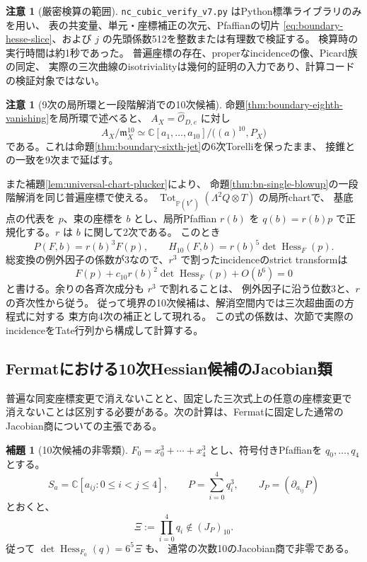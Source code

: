 \documentclass[a4paper,11pt]{ltjsarticle}
\theoremstyle{definition}
\newtheorem{lemma}[theorem]{補題}
\newtheorem{remark}[theorem]{注意}
\newcommand{\CC}{\mathbb C}
\newcommand{\OO}{\mathcal O}
\newcommand{\PP}{\mathbb P}
\begin{document}
\begin{remark}[厳密検算の範囲]
\texttt{nc\_cubic\_verify\_v7.py} はPython標準ライブラリのみを用い、
表の共変量、単元・座標補正の次元、Pfaffianの切片
\eqref{eq:boundary-hesse-slice}、および $j$ の先頭係数512を整数または有理数で検証する。
検算時の実行時間は約1秒であった。
普遍座標の存在、properなincidenceの像、Picard族の同定、
実際の三次曲線のisotrivialityは幾何的証明の入力であり、計算コードの検証対象ではない。
\end{remark}


\begin{remark}[9次の局所環と一段階解消での10次候補]
命題\ref{thm:boundary-eighth-vanishing}を局所環で述べると、
$A_X=\widehat{\OO}_{D,e}$ に対し
\[
 A_X/\mathfrak m_X^{10}
 \simeq\CC[a_1,\ldots,a_{10}]/\bigl((a)^{10},P_X\bigr)
\]
である。これは命題\ref{thm:boundary-sixth-jet}の6次Torelliを保ったまま、
接錐との一致を9次まで延ばす。

また補題\ref{lem:universal-chart-plucker}により、
命題\ref{thm:bn-single-blowup}の一段階解消を同じ普遍座標で使える。
$\operatorname{Tot}_{\PP(V^*)}(\Lambda^2Q\otimes T)$ の局所chartで、
基底点の代表を $p$、束の座標を $b$ とし、局所Pfaffian $r(b)$ を
$q(b)=r(b)p$ で正規化する。$r$ は $b$ に関して2次である。
このとき
\[
 P(F,b)=r(b)^3F(p),\qquad
 H_{10}(F,b)=r(b)^5\det\operatorname{Hess}_F(p).
\]
総変換の例外因子の係数が3なので、$r^3$ で割ったincidenceのstrict transformは
\[
 F(p)+c_{10}r(b)^2\det\operatorname{Hess}_F(p)+O(b^6)=0
\]
と書ける。余りの各斉次成分も $r^3$ で割れることは、
例外因子に沿う位数3と、$r$ の斉次性から従う。
従って境界の10次候補は、解消空間内では三次超曲面の方程式に対する
束方向4次の補正として現れる。
この式の係数は、次節で実際のincidenceをTate行列から構成して計算する。
\end{remark}

\subsection{Fermatにおける10次Hessian候補のJacobian類}

普遍な同変座標変更で消えないことと、固定した三次式上の任意の座標変更で
消えないことは区別する必要がある。次の計算は、Fermatに固定した通常のJacobian商についての主張である。

\begin{lemma}[10次候補の非零類]
\label{lem:fermat-tenth-jacobian}
$F_0=x_0^3+\cdots+x_4^3$ とし、符号付きPfaffianを $q_0,\ldots,q_4$ とする。
\[
 S_a=\CC[a_{ij}:0\le i<j\le4],\qquad
 P=\sum_{i=0}^4q_i^3,\qquad J_P=(\partial_{a_{ij}}P)
\]
とおくと、
\[
                  \Xi:=\prod_{i=0}^4q_i\notin(J_P)_{10}.
\]
従って $\det\operatorname{Hess}_{F_0}(q)=6^5\Xi$ も、
通常の次数10のJacobian商で非零である。
\end{lemma}
\end{document}
